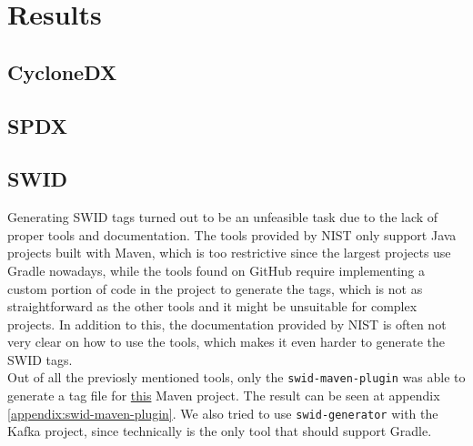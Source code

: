 \section{Results} \label{results}

\subsection{CycloneDX} \label{results:cdx}

\subsection{SPDX} \label{results:spdx}

\subsection{SWID} \label{results:swid}
Generating SWID tags turned out to be an unfeasible task due to the lack of proper tools and documentation. The tools provided by NIST only support Java projects built with Maven, which is too restrictive since the largest projects use Gradle nowadays, while the tools found on GitHub require implementing a custom portion of code in the project to generate the tags, which is not as straightforward as the other tools and it might be unsuitable for complex projects.
In addition to this, the documentation provided by NIST is often not very clear on how to use the tools, which makes it even harder to generate the SWID tags.
\\Out of all the previosly mentioned tools, only the \verb|swid-maven-plugin| was able to generate a tag file for \href{https://github.com/MithunTechnologiesDevOps/maven-web-application}{this} Maven project. The result can be seen at appendix \ref{appendix:swid-maven-plugin}.
We also tried to use \verb|swid-generator| with the Kafka project, since technically is the only tool that should support Gradle. 